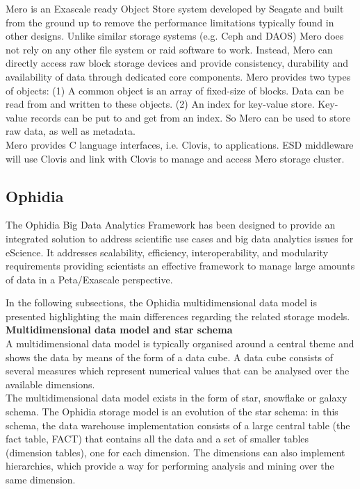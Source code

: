 Mero is an Exascale ready Object Store system developed by Seagate and built
from the ground up to remove the performance limitations typically found in
other designs. Unlike similar storage systems (e.g. Ceph and DAOS) Mero does
not rely on any other file system or raid software to work.
Instead, Mero can directly access raw block storage devices and provide consistency, durability
and availability of data through dedicated core components. Mero provides two
types of objects: (1) A common object is an array of fixed-size of blocks. Data
can be read from and written to these objects. (2) An index for key-value store.
Key-value records can be put to and get from an index. So Mero can be used to
store raw data, as well as metadata. \\
Mero provides C language interfaces, i.e. Clovis, to applications.
ESD middleware will use Clovis and link with Clovis to manage and access Mero storage cluster.

\subsection{Ophidia}
\label{Ophidia Storage Model}

The Ophidia Big Data Analytics Framework \cite{DBLP:conf/iccS/FioreDPFWA13} has been designed to provide an integrated solution to address scientific use cases and big data analytics issues for eScience.
It addresses scalability, efficiency, interoperability, and modularity requirements providing scientists an effective framework to manage large amounts of data in a Peta/Exascale perspective.

In the following subsections, the Ophidia multidimensional data model is presented highlighting the main differences regarding the related storage models.\\

\textbf{Multidimensional data model and star schema}\\

A multidimensional data model is typically organised around a central theme and shows the data by means of the form of a data cube. A data cube consists of several measures which represent numerical values that can be analysed over the available dimensions.\\

The multidimensional data model exists in the form of star, snowflake or galaxy schema.
The Ophidia storage model is an evolution of the star schema: in this schema, the data warehouse implementation consists of a large central table (the fact table, FACT) that contains all the data and a set of smaller tables (dimension tables), one for each dimension. The dimensions can also implement hierarchies, which provide a way for performing analysis and mining over the same dimension.

